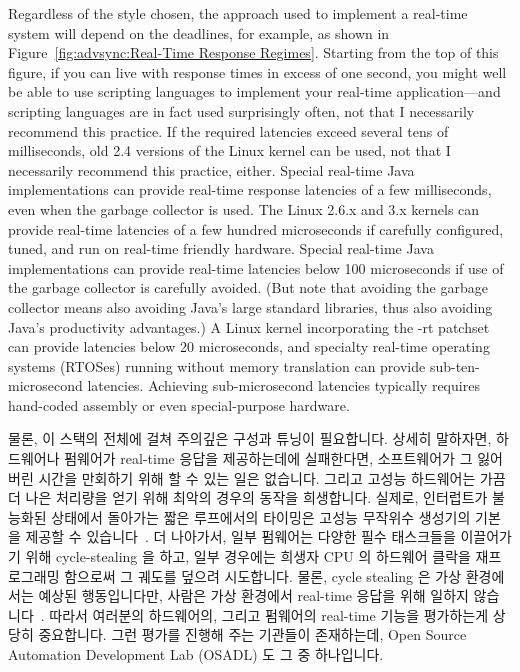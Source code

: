 Regardless of the style chosen, the approach used to implement a real-time
system will depend on the deadlines, for example, as shown in
Figure~\ref{fig:advsync:Real-Time Response Regimes}.
Starting from the top of this figure, if you can live with response times in
excess of one second, you might well be able to use scripting languages
to implement your real-time application---and scripting languages are
in fact used surprisingly often, not that I necessarily recommend this
practice.
If the required latencies exceed several tens of milliseconds,
old 2.4 versions of the Linux kernel can be used, not that I necessarily
recommend this practice, either.
Special real-time Java implementations can provide real-time response
latencies of a few milliseconds, even when the garbage collector is
used.
The Linux 2.6.x and 3.x kernels can provide real-time latencies of
a few hundred microseconds if carefully configured, tuned, and run
on real-time friendly hardware.
Special real-time Java implementations can provide real-time latencies
below 100 microseconds if use of the garbage collector is carefully avoided.
(But note that avoiding the garbage collector means also avoiding
Java's large standard libraries, thus also avoiding Java's productivity
advantages.)
A Linux kernel incorporating the -rt patchset can provide latencies
below 20 microseconds, and specialty real-time operating systems (RTOSes)
running without memory translation can provide sub-ten-microsecond
latencies.
Achieving sub-microsecond latencies typically requires hand-coded assembly
or even special-purpose hardware.
\fi

물론, 이 스택의 전체에 걸쳐 주의깊은 구성과 튜닝이 필요합니다.
상세히 말하자면, 하드웨어나 펌웨어가 real-time 응답을 제공하는데에 실패한다면,
소프트웨어가 그 잃어버린 시간을 만회하기 위해 할 수 있는 일은 없습니다.
그리고 고성능 하드웨어는 가끔 더 나은 처리량을 얻기 위해 최악의 경우의 동작을
희생합니다.
실제로, 인터럽트가 불능화된 상태에서 돌아가는 짧은 루프에서의 타이밍은 고성능
무작위수 생성기의 기본을 제공할 수
있습니다~\cite{PeterOkech2009InherentRandomness}.
더 나아가서, 일부 펌웨어는 다양한 필수 태스크들을 이끌어가기 위해
cycle-stealing 을 하고, 일부 경우에는 희생자 CPU 의 하드웨어 클락을
재프로그래밍 함으로써 그 궤도를 덮으려 시도합니다.
물론, cycle stealing 은 가상 환경에서는 예상된 행동입니다만, 사람은 가상
환경에서 real-time 응답을 위해 일하지
않습니다~\cite{ThomasGleixner2012KVMrealtime,JanKiszka2014virtRT}.
따라서 여러분의 하드웨어의, 그리고 펌웨어의 real-time 기능을 평가하는게 상당히
중요합니다.
그런 평가를 진행해 주는 기관들이 존재하는데, Open Source Automation Development
Lab (OSADL) 도 그 중 하나입니다.
\iffalse

